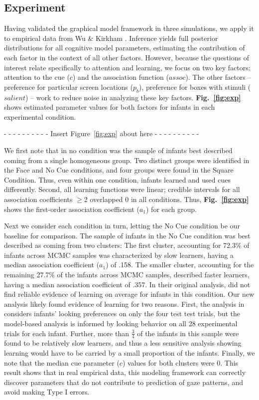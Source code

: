 \documentclass[12pt]{article}
\begin{document}
\subsection*{Experiment}

	Having validated the graphical model framework in three simulations, we apply it to empirical data from Wu \& Kirkham \cite{Wu2010a}. Inference yields full posterior distributions for all cognitive model parameters, estimating the contribution of each factor in the context of all other factors. However, because the questions of interest relate specifically to attention and learning, we focus on two key factors: attention to the cue ($c$) and the association function ($assoc$). The other factors -- preference for particular screen locations ($p_{b}$), preference for boxes with stimuli ($salient$) -- work to reduce noise in analyzing these key factors. \textbf{Fig.~\ref{fig:exp}} shows estimated parameter values for both factors for infants in each experimental condition.

\begin{center}- - - - - - - - - - Insert Figure~\ref{fig:exp} about here - - - - - - - - - -\end{center}

	We first note that in no condition was the sample of infants best described coming from a single homogeneous group. Two distinct groups were identified in the Face and No Cue conditions, and four groups were found in the Square Condition. Thus, even within one condition, infants learned and used cues differently. Second, all learning functions were linear; credible intervals for all association coefficients $\geq$2 overlapped 0 in all conditions. Thus, \textbf{Fig.~\ref{fig:exp}} shows the first-order association coefficient ($a_{1}$) for each group. 

	Next we consider each condition in turn, letting the No Cue condition be our baseline for comparison. The sample of infants in the No Cue condition was best described as coming from two clusters: The first cluster, accounting for 72.3\% of infants across MCMC samples was characterized by slow learners, having a median association coefficient ($a_{1}$) of .158. The smaller cluster, accounting for the remaining 27.7\% of the infants across MCMC samples, described faster learners, having a median association coefficient of .357. In their original analysis, \cite{Wu2010a} did not find reliable evidence of learning on average for infants in this condition. Our new analysis likely found evidence of learning for two reasons. First, the analysis in \cite{Wu2010a} considers infants' looking preferences on only the four test test trials, but the model-based analysis is informed by looking behavior on all 28 experimental trials for each infant. Further, more than $\frac{3}{4}$ of the infants in this sample were found to be relatively slow learners, and thus a less sensitive analysis showing learning would have to be carried by a small proportion of the infants. Finally, we note that the median cue parameter ($c$) values for both clusters were 0. This result shows that in real empirical data, this modeling framework can correctly discover parameters that do not contribute to prediction of gaze patterns, and avoid making Type I errors.
\end{document}
